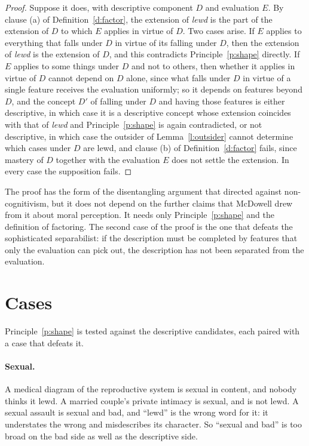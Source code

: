 \documentclass{situationist-preprint}
\begin{document}
\begin{proof}
Suppose it does, with descriptive component $D$ and evaluation $E$. By clause (a) of Definition~\ref{d:factor}, the extension of \emph{lewd} is the part of the extension of $D$ to which $E$ applies in virtue of $D$. Two cases arise. If $E$ applies to everything that falls under $D$ in virtue of its falling under $D$, then the extension of \emph{lewd} is the extension of $D$, and this contradicts Principle~\ref{p:shape} directly. If $E$ applies to some things under $D$ and not to others, then whether it applies in virtue of $D$ cannot depend on $D$ alone, since what falls under $D$ in virtue of a single feature receives the evaluation uniformly; so it depends on features beyond $D$, and the concept $D'$ of falling under $D$ and having those features is either descriptive, in which case it is a descriptive concept whose extension coincides with that of \emph{lewd} and Principle~\ref{p:shape} is again contradicted, or not descriptive, in which case the outsider of Lemma~\ref{l:outsider} cannot determine which cases under $D$ are lewd, and clause (b) of Definition~\ref{d:factor} fails, since mastery of $D$ together with the evaluation $E$ does not settle the extension. In every case the supposition fails.
\end{proof}

The proof has the form of the disentangling argument that \citet{McDowell1981} directed against non-cognitivism, but it does not depend on the further claims that McDowell drew from it about moral perception. It needs only Principle~\ref{p:shape} and the definition of factoring. The second case of the proof is the one that defeats the sophisticated separabilist: if the description must be completed by features that only the evaluation can pick out, the description has not been separated from the evaluation.

\section{Cases}\label{s:cases}

Principle~\ref{p:shape} is tested against the descriptive candidates, each paired with a case that defeats it.

\paragraph{Sexual.} A medical diagram of the reproductive system is sexual in content, and nobody thinks it lewd. A married couple's private intimacy is sexual, and is not lewd. A sexual assault is sexual and bad, and \enquote{lewd} is the wrong word for it: it understates the wrong and misdescribes its character. So \enquote{sexual and bad} is too broad on the bad side as well as the descriptive side.
\end{document}
